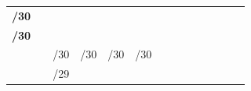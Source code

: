 \documentclass[11pt,a4paper]{report}
\begin{document}
\begin{table}[]
\begin{center}
\begin{tabular}{rlcccccccccccccccc}
\textbf{/30}                                                                                             &                       &                           &                           & \cellcolor[HTML]{C09FE5}  & \cellcolor[HTML]{C09FE5}  &                           &                            &                            &                            &                                 &                                 &                                 &                                 &                                 &                                 &                                  &                                 \\ \cline{3-18} 
\textbf{/30}                                                                                             &                       & \cellcolor[HTML]{C09FE5}  & \cellcolor[HTML]{C09FE5}  &                           &                           &                           &                            &                            &                            &                                 &                                 &                                 &                                 &                                 &                                 &                                  &                                 \\ \cline{1-1} \cline{3-18} 
                                                                                                         & \multicolumn{1}{l|}{} & \multicolumn{2}{l}{\cellcolor[HTML]{C09FE5}/30}       & \multicolumn{2}{c}{\cellcolor[HTML]{C09FE5}/30}       & \multicolumn{2}{c}{\cellcolor[HTML]{C09FE5}/30}        & \multicolumn{2}{c}{\cellcolor[HTML]{C09FE5}/30}         & \multicolumn{2}{c}{\cellcolor[HTML]{BFBFBF}}                      & \multicolumn{2}{c}{\cellcolor[HTML]{FFD966}}                      & \multicolumn{2}{c}{\cellcolor[HTML]{A9D08E}}                      & \multicolumn{2}{c|}{\cellcolor[HTML]{F4B084}}                      \\
                                                                                                         & \multicolumn{1}{l|}{} & \multicolumn{4}{l}{/29}                                                                                       & \multicolumn{4}{c}{}                                                                                             & \multicolumn{2}{c}{\cellcolor[HTML]{BFBFBF}}                      & \multicolumn{2}{c}{\cellcolor[HTML]{FFD966}}                      & \multicolumn{2}{c}{\cellcolor[HTML]{A9D08E}}                      & \multicolumn{2}{c|}{\cellcolor[HTML]{F4B084}}                      \\

\end{tabular}
\end{center}
\end{table}
\end{document}
